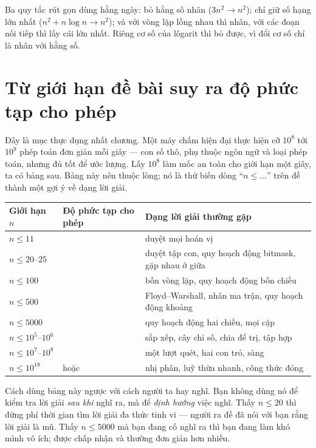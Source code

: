 \documentclass[../../algorithm.tex]{subfiles}
\begin{document}
Ba quy tắc rút gọn dùng hằng ngày: bỏ hằng số nhân (\(3n^2 \rightarrow n^2\)); chỉ giữ số hạng lớn nhất (\(n^2 + n\log n \rightarrow n^2\)); và với vòng lặp lồng nhau thì nhân, với các đoạn nối tiếp thì lấy cái lớn nhất. Riêng cơ số của lôgarit thì bỏ được, vì đổi cơ số chỉ là nhân với hằng số.

\section{Từ giới hạn đề bài suy ra độ phức tạp cho phép}

Đây là mục thực dụng nhất chương. Một máy chấm hiện đại thực hiện cỡ \(10^8\) tới \(10^9\) phép toán đơn giản mỗi giây --- con số thô, phụ thuộc ngôn ngữ và loại phép toán, nhưng đủ tốt để ước lượng. Lấy \(10^8\) làm mốc an toàn cho giới hạn một giây, ta có bảng sau. Bảng này nên thuộc lòng; nó là thứ biến dòng ``\(n \le \dots\)'' trên đề thành một gợi ý về dạng lời giải.

\begin{center}\footnotesize
\begin{tabularx}{\linewidth}{@{}L{2.6cm}L{3.0cm}Y@{}}
\toprule
\textbf{Giới hạn \(n\)} & \textbf{Độ phức tạp cho phép} & \textbf{Dạng lời giải thường gặp}\\
\midrule
\(n \le 11\) &  & duyệt mọi hoán vị\\
\(n \le 20\text{--}25\) &  & duyệt tập con, quy hoạch động bitmask, gặp nhau ở giữa\\
\(n \le 100\) &  & bốn vòng lặp, quy hoạch động bốn chiều\\
\(n \le 500\) &  & Floyd--Warshall, nhân ma trận, quy hoạch động khoảng\\
\(n \le 5000\) &  & quy hoạch động hai chiều, mọi cặp\\
\(n \le 10^5\text{--}10^6\) &  & sắp xếp, cây chỉ số, chia để trị, tập hợp\\
\(n \le 10^7\text{--}10^8\) &  & một lượt quét, hai con trỏ, sàng\\
\(n \le 10^{18}\) &  hoặc  & nhị phân, luỹ thừa nhanh, công thức đóng\\
\bottomrule
\end{tabularx}
\end{center}

Cách dùng bảng này ngược với cách người ta hay nghĩ. Bạn không dùng nó để kiểm tra lời giải \emph{sau khi} nghĩ ra, mà để \emph{định hướng} việc nghĩ. Thấy \(n \le 20\) thì đừng phí thời gian tìm lời giải đa thức tinh vi --- người ra đề đã nói với bạn rằng lời giải là mũ. Thấy \(n \le 5000\) mà bạn đang cố nghĩ ra  thì bạn đang làm khó mình vô ích;  được chấp nhận và thường đơn giản hơn nhiều.
\end{document}
